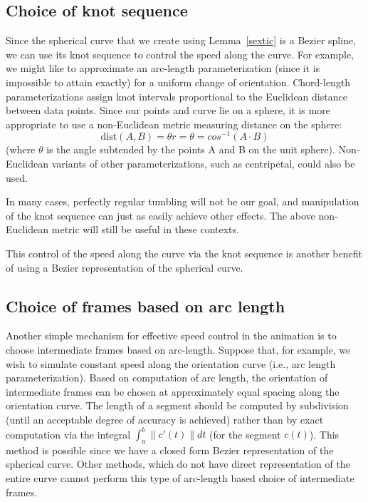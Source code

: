 \subsection{Choice of knot sequence}

Since the spherical curve that we create using Lemma~\ref{sextic}
is a Bezier spline, we can use its knot sequence to control
the speed along the curve.
For example, we might like to approximate an arc-length parameterization
(since it is impossible to attain exactly)
for a uniform change of orientation.
Chord-length parameterizations assign knot intervals proportional
to the Euclidean distance between data points.
Since our points and curve lie on a sphere, it is more appropriate
to use a non-Euclidean metric measuring distance on the sphere:
\[
\mbox{dist}(A,B) = \theta r = \theta = cos^{-1}(A \cdot B)
\]
(where $\theta$ is the angle subtended by the points A and B on the unit sphere).
Non-Euclidean variants of other parameterizations, such as centripetal,
could also be used.

In many cases, perfectly regular tumbling will not be our goal,
and manipulation of the knot sequence can just as easily achieve
other effects.
The above non-Euclidean metric will still be useful in these contexts.

This control of the speed along the curve via the knot sequence 
is another benefit of using a Bezier representation of the spherical curve.

\subsection{Choice of frames based on arc length}

Another simple mechanism for effective speed control in the animation
is to choose intermediate frames based on arc-length.
Suppose that, for example, we wish to simulate constant speed along
the orientation curve (i.e., arc length parameterization).
Based on computation of arc length, the orientation of intermediate frames
can be chosen at approximately equal spacing along the orientation curve.
The length of a segment should be computed by subdivision
(until an acceptable degree of accuracy is achieved)
rather than by exact computation via the integral 
$\int_a^b \|c'(t)\| dt$ (for the segment $c(t)$).
This method is possible since we have a closed form Bezier representation
of the spherical curve.  Other methods, which do not have
direct representation of the entire curve cannot perform
this type of arc-length based choice of intermediate frames.

